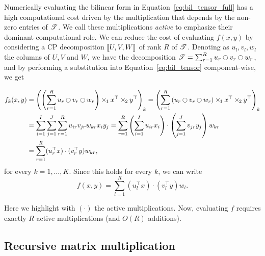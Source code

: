 \documentclass[a4paper, leqno, 11pt]{article}
\theoremstyle{definition}
\theoremstyle{remark}
\theoremstyle{experimental}
\begin{document}
Numerically evaluating the bilinear form in Equation~\ref{eq:bil_tensor_full} has a high computational cost driven by the multiplication that depends by the non-zero entries of $ \Tn{t}
$. We call these multiplications \emph{active} to emphasize their dominant computational role. We can reduce the cost of evaluating $
f(x,y) $ by
considering a CP decomposition $ \dsqr{U,V,W} $ of rank $ R $ of $ \Tn{t} $.
Denoting as $ u_l, v_l, w_l$ the columns of $ U,V $ and $ W $, we have
the decomposition $ \Tn{t} =
\sum_{r=1}^R u_r \topp v_r \topp w_r $, and by performing a substitution into
Equation~\ref{eq:bil_tensor} component-wise, we get

\begin{equation}
  \label{eq:b_active}
  \begin{aligned}
    f_k(x,y) &= \left( \left( \sum_{r=1}^R u_r \topp v_r \topp w_r \right) \ttm[1] x^{\top} \ttm[2]
  y^{\top}  \right)_k  
             = \left( \sum_{r=1}^R \left( u_r \topp v_r \topp w_r  \right) \ttm[1] x^{\top} \ttm[2]
    y^{\top} \right)_k  \\ 
             &=
  \sum_{i=1}^I \sum_{j=1}^J \sum_{r=1}^R u_{ir}v_{jr}w_{kr} x_i y_j = \sum_{r=1}^R \left(\sum_{i=1}^I 
    u_{ir} x_i \right) \cdot \left( \sum_{j=1}^J v_{jr} y_j  \right)  w_{kr} \\
             &= \sum_{r=1}^R
   (u_r^{\top}x) \cdot (v_r^{\top}y)w_{kr},
  \end{aligned}
\end{equation}
for every $ k = 1, \ldots, K $. Since this holds for every $ k $, we can write
\begin{equation}
  \label{eq:active_final}
  f(x,y) = \sum_{l=1}^R (u_l^{\top}x)\cdot(v_l^{\top}y)w_l.
\end{equation}

Here we highlight with $ (\cdot) $ the active multiplications. Now, evaluating $ f $ requires exactly $ R $ active multiplications (and $ O(R) $ additions).

\subsection{Recursive matrix multiplication}
\end{document}
